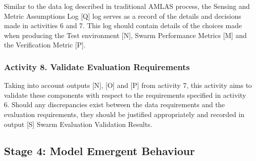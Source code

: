 \documentclass[runningheads]{llncs}
\begin{document}
Similar to the data log described in traditional AMLAS process, the Sensing and Metric Assumptions Log [Q] log serves as a record of the details and decisions made in activities 6 and 7. This log should contain details of the choices made when producing the Test environment [N], Swarm Performance Metrics [M] and the Verification Metric [P].

\subsubsection*{Activity 8. Validate Evaluation Requirements}

Taking into account outputs [N], [O] and [P] from activity 7, this activity aims to validate these components with respect to the requirements specified in activity 6. Should any discrepancies exist between the data requirements and the evaluation requirements, they should be justified appropriately and recorded in output [S] Swarm Evaluation Validation Results.

\subsection{Stage 4: Model Emergent Behaviour} \label{framework-stage4}


\end{document}
